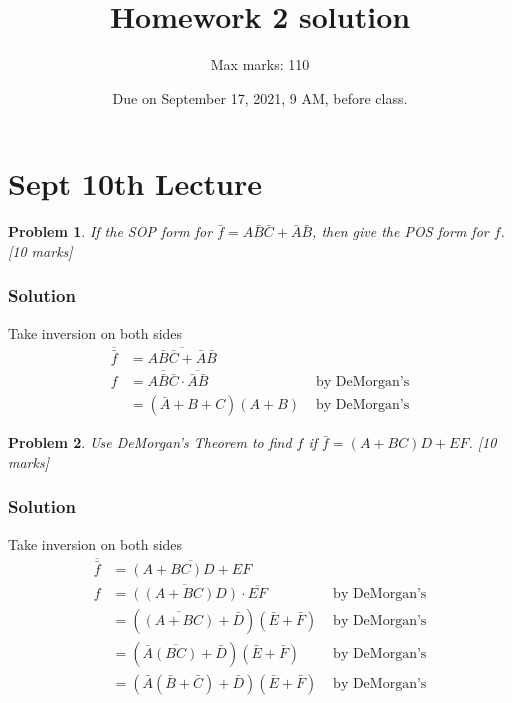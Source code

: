\documentclass[twocolumn]{article}
\title{Homework 2  solution}
\author{Max marks: 110}
\date{Due on September 17, 2021, 9 AM, before class.}
\newtheorem{prob}{Problem}
\newcommand{\bA}{\bar{A}}
\newcommand{\bB}{\bar{B}}
\newcommand{\bC}{\bar{C}}
\begin{document}
\maketitle

\section{Sept 10th Lecture}
\begin{prob}
If the SOP form for $ \bar{f} = A\bB\bC+\bA\bB$, then give the POS form for
$f$. [10 marks]
\end{prob}
\subsubsection*{Solution}

Take inversion on both sides
\begin{align*}
  \overline{\bar{f}} &= \overline{A\bB\bC+\bA\bB} &
  \\
  f  &= \overline{A\bB\bC} \cdot \overline{\bA\bB} & \text{ by DeMorgan's}
  \\
    &= (\bA + B + C) (A + B) & \text{ by DeMorgan's}
\end{align*}

\begin{prob}
Use DeMorgan's Theorem to find $f$  if  $\bar{f} = (A + BC)D + EF$. [10 marks]
\end{prob}

\subsubsection*{Solution}
Take inversion on both sides
\begin{align*}
  \overline{\bar{f}} &= \overline{(A+BC)D + EF} &
  \\
  f  &= \overline{((A+BC)D)} \cdot \overline{EF} & \text{ by DeMorgan's}
  \\
  &= (\overline{(A+BC)} + \bar{D}) (\bar{E}+\bar{F}) & \text{ by DeMorgan's}
  \\
  &= (\bA\overline{(BC)} + \bar{D}) (\bar{E}+\bar{F}) & \text{ by DeMorgan's}
  \\
  &= (\bA(\bB + \bC) + \bar{D}) (\bar{E}+\bar{F}) & \text{ by DeMorgan's}
\end{align*}
\end{document}
